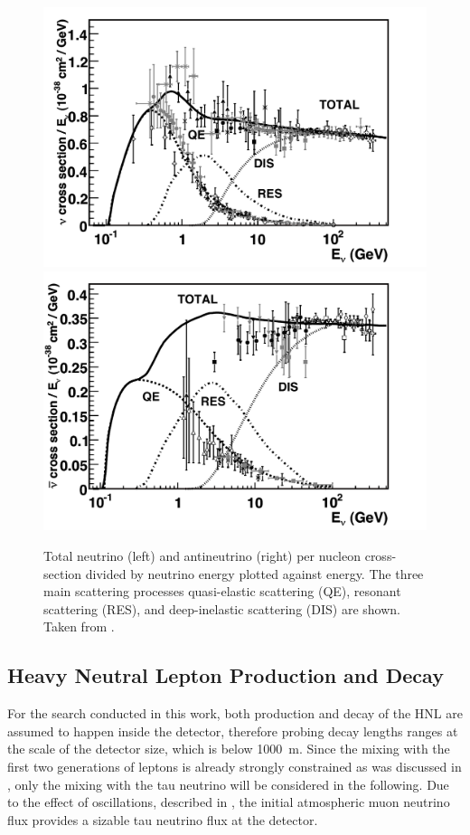 \begin{figure}[h]
	\centering
    \includegraphics[width=0.495\linewidth]{figures/neutrinos_properties/cc_inclusive_nu.pdf}
    \includegraphics[width=0.495\linewidth]{figures/neutrinos_properties/cc_inclusive_nubar.pdf}
	\caption[Total inclusive neutrino-nucleon cross-sections]{Total neutrino (left) and antineutrino (right) per nucleon cross-section divided by neutrino energy plotted against energy.
    The three main scattering processes quasi-elastic scattering (QE), resonant scattering (RES), and deep-inelastic scattering (DIS) are shown. Taken from \cite{Formaggio_Cross_Sections}.}
\end{figure}


\subsection{Heavy Neutral Lepton Production and Decay} 


For the search conducted in this work, both production and decay of the HNL are assumed to happen inside the detector, therefore probing decay lengths ranges at the scale of the detector size, which is below \SI{1000}{\meter}. Since the mixing with the first two generations of leptons is already strongly constrained as was discussed in , only the mixing with the tau neutrino will be considered in the following. Due to the effect of oscillations, described in , the initial atmospheric muon neutrino flux provides a sizable tau neutrino flux at the detector.

